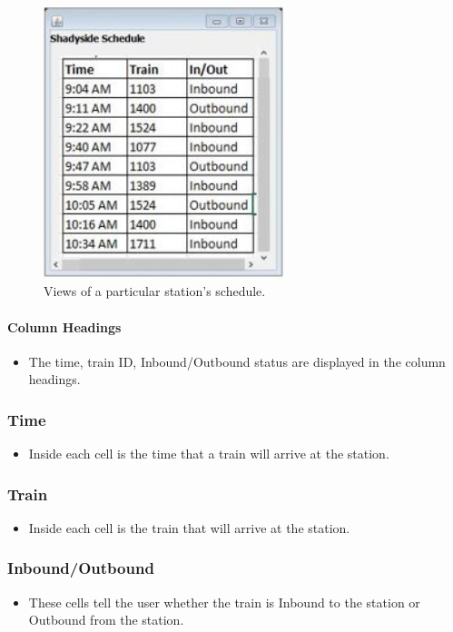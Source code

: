 \documentclass[letterpaper]{article}
\begin{document}
\begin{figure}[h!]
	\center
	\includegraphics[width=7cm]{station_view}
	\caption{Views of a particular station's schedule.}
\end{figure}

	\paragraph{Column Headings}
		\begin{itemize}
			\item The time, train ID, Inbound/Outbound status are displayed in the column headings.
		\end{itemize}
	
	\subsubsection{Time}
		\begin{itemize}
			\item Inside each cell is the time that a train will arrive at the station.
		\end{itemize}
	
	\subsubsection{Train}
		\begin{itemize}
			\item Inside each cell is the train that will arrive at the station.
		\end{itemize}
	
	\subsubsection{Inbound/Outbound}
		\begin{itemize}
			\item These cells tell the user whether the train is Inbound to the station or Outbound from the station.
		\end{itemize}
\end{document}
